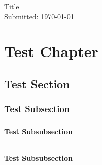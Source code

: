 \documentclass{book}
\begin{document}
\begin{titlepage}

\vspace*{\fill} %

\begin{center}

{\LARGE Title}\\ [1.5cm]

Submitted: \today

\end{center}

\vspace*{\fill} %

\end{titlepage}

\tableofcontents

\chapter{Test Chapter}

\section{Test Section}
\lipsum[2]
\subsection{Test Subsection}
\lipsum[2]
\paragraph{}%
\lipsum[2]
\subsubsection{Test Subsubsection}
\lipsum[2]
\subparagraph{}%
\lipsum[2]
\subsubsection{Test Subsubsection}
\lipsum[2]
\subparagraph{}%
\lipsum[2]
\end{document}
